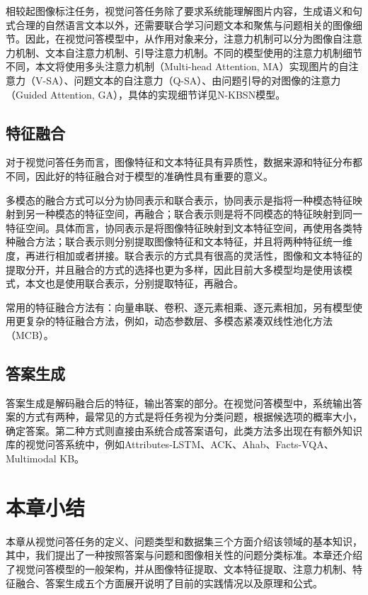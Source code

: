 相较起图像标注任务，视觉问答任务除了要求系统能理解图片内容，生成语义和句式合理的自然语言文本以外，还需要联合学习问题文本和聚焦与问题相关的图像细节。因此，在视觉问答模型中，从作用对象来分，注意力机制可以分为图像自注意力机制、文本自注意力机制、引导注意力机制。不同的模型使用的注意力机制细节不同，本文将使用多头注意力机制（Multi-head Attention, MA）实现图片的自注意力（V-SA）、问题文本的自注意力（Q-SA）、由问题引导的对图像的注意力（Guided Attention, GA），具体的实现细节详见N-KBSN模型。

\subsection{特征融合}
对于视觉问答任务而言，图像特征和文本特征具有异质性，数据来源和特征分布都不同，因此好的特征融合对于模型的准确性具有重要的意义。

多模态的融合方式可以分为协同表示和联合表示，协同表示是指将一种模态特征映射到另一种模态的特征空间，再融合；联合表示则是将不同模态的特征映射到同一特征空间。具体而言，协同表示是将图像特征映射到文本特征空间，再使用各类特种融合方法；联合表示则分别提取图像特征和文本特征，并且将两种特征统一维度，再进行相加或者拼接。联合表示的方式具有很高的灵活性，图像和文本特征的提取分开，并且融合的方式的选择也更为多样，因此目前大多模型均是使用该模式，本文也是使用联合表示，分别提取特征，再融合。

常用的特征融合方法有：向量串联、卷积、逐元素相乘、逐元素相加，另有模型使用更复杂的特征融合方法，例如，动态参数层、多模态紧凑双线性池化方法（MCB）。

\subsection{答案生成}
答案生成是解码融合后的特征，输出答案的部分。在视觉问答模型中，系统输出答案的方式有两种，最常见的方式是将任务视为分类问题，根据候选项的概率大小，确定答案。第二种方式则直接由系统合成答案语句，此类方法多出现在有额外知识库的视觉问答系统中，例如Attributes-LSTM、ACK、Ahab、Facts-VQA、Multimodal KB。

\section{本章小结}
本章从视觉问答任务的定义、问题类型和数据集三个方面介绍该领域的基本知识，其中，我们提出了一种按照答案与问题和图像相关性的问题分类标准。本章还介绍了视觉问答模型的一般架构，并从图像特征提取、文本特征提取、注意力机制、特征融合、答案生成五个方面展开说明了目前的实践情况以及原理和公式。
